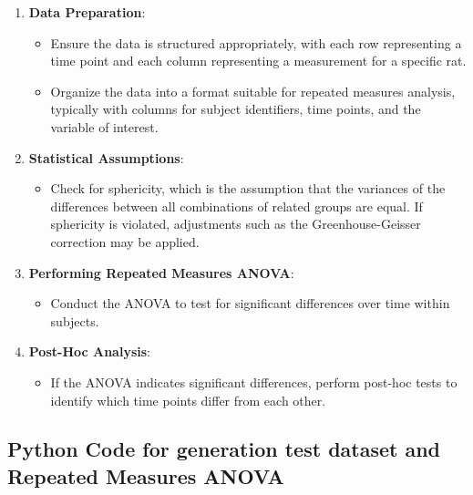\documentclass[english, a4paper, 11pt]{article}
\begin{document}
\begin{enumerate}
    \item \textbf{Data Preparation}:
          \begin{itemize}
              \item Ensure the data is structured appropriately, with each row representing a time point and each column representing a measurement for a specific rat.
              \item Organize the data into a format suitable for repeated measures analysis, typically with columns for subject identifiers, time points, and the variable of interest.
          \end{itemize}
    \item \textbf{Statistical Assumptions}:
          \begin{itemize}
              \item Check for sphericity, which is the assumption that the variances of the differences between all combinations of related groups are equal. If sphericity is violated, adjustments such as the Greenhouse-Geisser correction may be applied.
          \end{itemize}
    \item \textbf{Performing Repeated Measures ANOVA}:
          \begin{itemize}
              \item Conduct the ANOVA to test for significant differences over time within subjects.
          \end{itemize}
    \item \textbf{Post-Hoc Analysis}:
          \begin{itemize}
              \item If the ANOVA indicates significant differences, perform post-hoc tests to identify which time points differ from each other.
          \end{itemize}
\end{enumerate}

\subsection*{Python Code for generation test dataset and Repeated Measures ANOVA}
\end{document}
